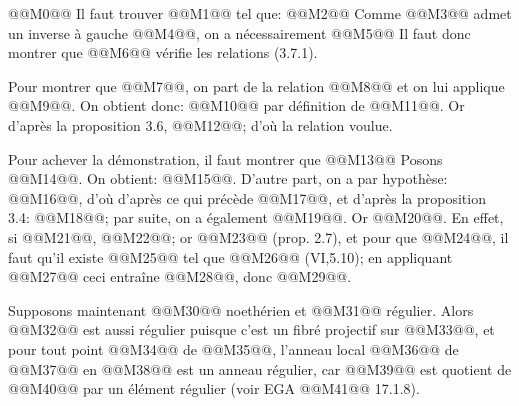 
@@M0@@
Il
faut trouver @@M1@@ tel que:
@@M2@@
Comme @@M3@@ admet un inverse à gauche @@M4@@, on a nécessairement
@@M5@@
Il faut donc montrer que @@M6@@ vérifie les relations (3.7.1).

Pour montrer que @@M7@@, on part de la relation @@M8@@ et on lui applique @@M9@@. On obtient donc: @@M10@@ par définition de @@M11@@. Or d'après la proposition 3.6, @@M12@@; d'où la relation voulue.

Pour achever la démonstration, il faut montrer que
@@M13@@
Posons @@M14@@. On obtient: @@M15@@. D'autre part, on a par hypothèse: @@M16@@, d'où d'après ce qui précède @@M17@@, et d'après la proposition 3.4: @@M18@@; par suite, on a également @@M19@@. Or @@M20@@. En effet, si @@M21@@, @@M22@@; or @@M23@@ (prop. 2.7), et pour que @@M24@@, il faut qu'il existe @@M25@@ tel que @@M26@@ (VI,5.10); en appliquant @@M27@@ ceci entraîne @@M28@@, donc @@M29@@.

Supposons maintenant @@M30@@ noethérien et @@M31@@ régulier. Alors @@M32@@ est aussi régulier puisque c'est un fibré projectif sur @@M33@@, et pour tout point @@M34@@ de @@M35@@, l'anneau local @@M36@@ de @@M37@@ en @@M38@@ est un anneau régulier, car @@M39@@ est quotient de @@M40@@ par un élément régulier (voir EGA @@M41@@ 17.1.8).

